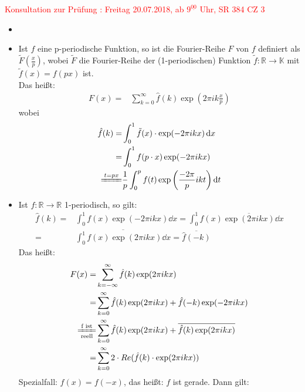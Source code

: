 \textcolor{red}{Konsultation zur Prüfung : Freitag 20.07.2018, 
ab $9^{\underline{00}}$ Uhr, SR 384 CZ 3}

\begin{Bemerkung}{
	\begin{itemize}
		\item[ ]
		\item Ist $f$ eine p-periodische Funktion, so ist die Fourier-Reihe $F$ 
		von $f$ definiert als $\tilde{F}(\frac{x}{p})$, wobei $\tilde{F}$ die 
		Fourier-Reihe der (1-periodischen) Funktion $\tilde{f}: \mathbb{R} 
		\rightarrow \mathbb{K}$ mit $\tilde{f}(x) = f(px)$ ist. \\
		Das heißt:
		\begin{align*}
			F(x) = & \sum_{k=0}^{\infty} \hat{f}(k) \exp\left( 2\pi i k 
				\frac{x}{p}\right)
		\end{align*}
		wobei
		\begin{align*}
			\hat{f} (k) = & \int_0^1 \tilde{f}(x) \cdot 
				\exp(-2\pi i k x) \dd{x} \\
			 = & \int_0^1 f(p\cdot x)\exp(-2\pi i k x) \\
			\xlongequal{t = px} & \frac{1}{p}\int_0^p f(t) 
			\exp\left( \frac{-2\pi}{p}ikt \right) \dd{t}
		\end{align*}
		\item Ist $f: \mathbb{R} \rightarrow \mathbb{R}$ 1-periodisch, so 
		gilt:
		\begin{align*}
			\hat{f}(k) = & \int_0^1 f(x) \exp( -2\pi i k x) \dd{x}	
			= \int_0^1 f(x) \overline{\exp(2\pi i k x)} \dd{x} \\
			= & \overline{\int_0^1 f(x) \exp(2\pi i k x) \dd{x}} = 
			\overline{\hat{f}(-k)}			
		\end{align*}		
		Das heißt:
		\begin{align}
			F(x) = & \sum_{k= - \infty}^{\infty} \hat{f}(k) \exp(2\pi i k x) 
				\notag \\ 
			= &\sum_{k=0}^{\infty} \hat{f}(k) \exp(2\pi ikx) + \hat{f}(-k) 
			\exp(-2\pi i kx) \notag \\
			\xlongequal[\text{reell}]{\text{f ist}} &
			\sum_{k=0}^{\infty} \hat{f}(k)\exp(2\pi ikx) 
				+ \overline{\hat{f}(k) \exp(2\pi ikx)} \notag \\ 
			= & \sum_{k=0}^{\infty} 2 \cdot Re(\hat{f}(k) \cdot 
			\exp(2\pi i kx)) \label{vl_19_gl_1}
		\end{align}
		Spezialfall: $f(x) = f(-x)$, das heißt: $f$ ist gerade. Dann gilt:

\end{itemize}}
\end{Bemerkung}
